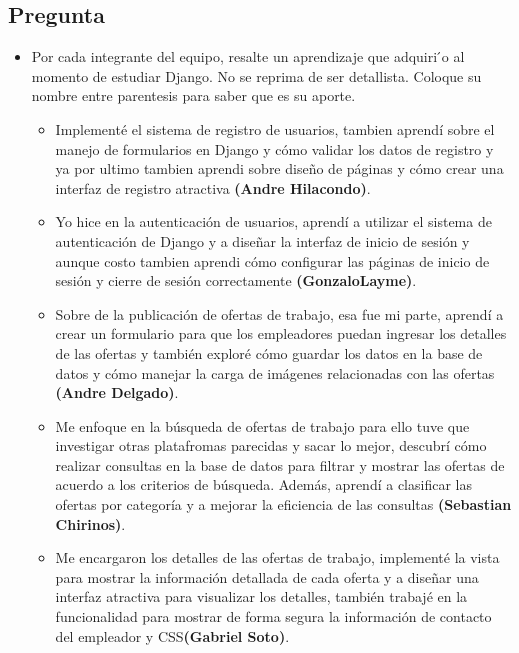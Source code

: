 \documentclass{article}
\begin{document}
    \subsection{Pregunta}
    \begin{itemize}
    \item Por cada integrante del equipo, resalte un aprendizaje que adquiri ́o al momento de estudiar Django. No se reprima de ser detallista. Coloque su nombre entre parentesis para saber que es su aporte.
    \begin{itemize}
        \item Implementé el sistema de registro de usuarios, tambien aprendí sobre el manejo de formularios en Django y cómo validar los datos de registro y ya por ultimo tambien aprendi sobre diseño de páginas y cómo crear una interfaz de registro atractiva \textbf{(Andre Hilacondo)}.
        \item Yo hice en la autenticación de usuarios, aprendí a utilizar el sistema de autenticación de Django y a diseñar la interfaz de inicio de sesión y aunque costo tambien aprendi cómo configurar las páginas de inicio de sesión y cierre de sesión correctamente \textbf{(GonzaloLayme)}.
        \item Sobre de la publicación de ofertas de trabajo, esa fue mi parte, aprendí a crear un formulario para que los empleadores puedan ingresar los detalles de las ofertas y también exploré cómo guardar los datos en la base de datos y cómo manejar la carga de imágenes relacionadas con las ofertas \textbf{(Andre Delgado)}.
        \item Me enfoque en la búsqueda de ofertas de trabajo para ello tuve que investigar otras platafromas parecidas y sacar lo mejor, descubrí cómo realizar consultas en la base de datos para filtrar y mostrar las ofertas de acuerdo a los criterios de búsqueda. Además, aprendí a clasificar las ofertas por categoría y a mejorar la eficiencia de las consultas \textbf{(Sebastian Chirinos)}.
        \item Me encargaron los detalles de las ofertas de trabajo, implementé la vista para mostrar la información detallada de cada oferta y a diseñar una interfaz atractiva para visualizar los detalles, también trabajé en la funcionalidad para mostrar de forma segura la información de contacto del empleador y CSS\textbf{(Gabriel Soto)}.
    \end{itemize}
    \end{itemize}   
    
\end{document}
